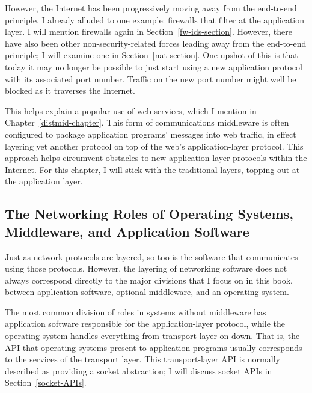 However, the Internet has been progressively moving away from the
end-to-end principle.  I already alluded to one example: firewalls
that filter at the application layer.  I will mention firewalls again
in Section~\ref{fw-ids-section}.  However, there have also been other
non-security-related forces leading away from the end-to-end
principle; I will examine one in Section~\ref{nat-section}.  One upshot
of this is that today it may no longer be possible to just start
using a new application protocol with its associated port number.
Traffic on the new port number might well be blocked as it traverses
the Internet.

This helps explain a popular use of web services, which I mention in
Chapter~\ref{distmid-chapter}.  This form of communications middleware
is often configured to package application programs' messages into
web traffic, in effect layering yet another protocol on top of
the web's application-layer protocol.  This approach helps circumvent obstacles to
new application-layer protocols within the Internet.  For this
chapter, I will stick with the traditional layers, topping out at the
application layer.

\subsection{The Networking Roles of Operating Systems, Middleware, and Application
  Software}

Just as network protocols are layered, so too is the software that
communicates using those protocols.  However, the layering of
networking software does not always correspond directly to the major
divisions that I focus on in this book, between application software,
optional middleware, and an operating system.

The most common division of roles in systems without middleware has
application software responsible for the application-layer protocol,
while the operating system handles everything from transport layer on
down.  That is, the API that operating systems present to application
programs usually corresponds to the services of the transport layer.
This transport-layer API is normally described as providing a
socket abstraction; I will discuss socket APIs in
Section~\ref{socket-APIs}.

